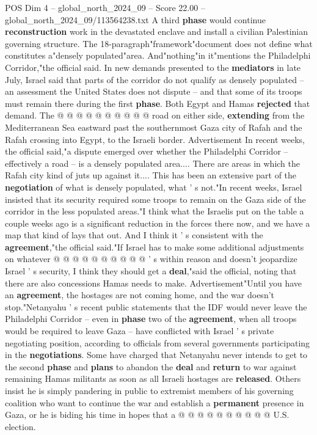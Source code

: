 \begin{textsample}{POS Dim 4 – global\_north\_2024\_09 – Score 22.00 – global\_north\_2024\_09/113564238.txt}
A third \textbf{phase} would continue \textbf{reconstruction} work in the devastated enclave and install a civilian Palestinian governing structure.
The 18-paragraph"framework"document does not define what constitutes a"densely populated"area.
And"nothing"in it"mentions the Philadelphi Corridor,"the official said.
In new demands presented to the \textbf{mediators} in late July, Israel said that parts of the corridor do not qualify as densely populated -- an assessment the United States does not dispute -- and that some of its troops must remain there during the first \textbf{phase}.
Both Egypt and Hamas \textbf{rejected} that demand.
The @ @ @ @ @ @ @ @ @ @ road on either side, \textbf{extending} from the Mediterranean Sea eastward past the southernmost Gaza city of Rafah and the Rafah crossing into Egypt, to the Israeli border.
Advertisement In recent weeks, the official said,"a dispute emerged over whether the Philadelphi Corridor -- effectively a road -- is a densely populated area....
There are areas in which the Rafah city kind of juts up against it....
This has been an extensive part of the \textbf{negotiation} of what is densely populated, what ' s not."In recent weeks, Israel insisted that its security required some troops to remain on the Gaza side of the corridor in the less populated areas."I think what the Israelis put on the table a couple weeks ago is a significant reduction in the forces there now, and we have a map that kind of lays that out.
And I think it ' s consistent with the \textbf{agreement},"the official said."If Israel has to make some additional adjustments on whatever @ @ @ @ @ @ @ @ @ @ ' s within reason and doesn't jeopardize Israel ' s security, I think they should get a \textbf{deal},"said the official, noting that there are also concessions Hamas needs to make.
Advertisement"Until you have an \textbf{agreement}, the hostages are not coming home, and the war doesn't stop."Netanyahu ' s recent public statements that the IDF would never leave the Philadelphi Corridor -- even in \textbf{phase} two of the \textbf{agreement}, when all troops would be required to leave Gaza -- have conflicted with Israel ' s private negotiating position, according to officials from several governments participating in the \textbf{negotiations}.
Some have charged that Netanyahu never intends to get to the second \textbf{phase} and \textbf{plans} to abandon the \textbf{deal} and \textbf{return} to war against remaining Hamas militants as soon as all Israeli hostages are \textbf{released}.
Others insist he is simply pandering in public to extremist members of his governing coalition who want to continue the war and establish a \textbf{permanent} presence in Gaza, or he is biding his time in hopes that a @ @ @ @ @ @ @ @ @ @ U.S. election.

\end{textsample}
